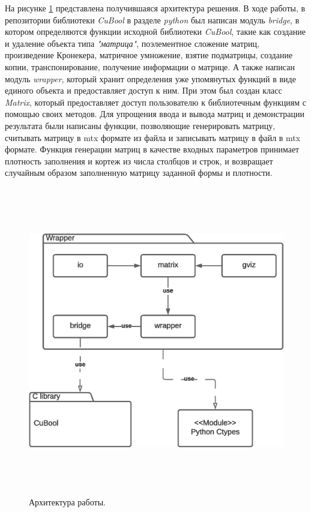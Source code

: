 \documentclass[14pt]{matmex-diploma}
\begin{document}
На рисунке \ref{pic:projectPython} представлена получившаяся архитектура решения. 
В ходе работы, в репозитории библиотеки \textit{CuBool}\cite{cuBool} в разделе \textit{python}
был написан модуль \textit{bridge}, в котором определяются функции исходной библиотеки \textit{CuBool},
такие как создание и удаление объекта типа \textit{"матрица"}, поэлементное сложение матриц, произведение Кронекера,
матричное умножение, взятие подматрицы, создание копии, транспонирование, получение информации о матрице. 
А также написан модуль \textit{wrapper},
который хранит определения уже упомянутых функций в виде единого объекта и предоставляет доступ к ним.
При этом был создан класс \textit{Matrix}, который предоставляет доступ пользователю к библиотечным функциям с помощью своих методов.
Для упрощения ввода и вывода матриц и демонстрации результата были написаны функции,
позволяющие генерировать матрицу, считывать матрицу в mtx формате из файла и записывать матрицу в файл в mtx формате.
Функция генерации матриц в качестве входных параметров принимает плотность заполнения и кортеж из числа столбцов и строк,
и возвращает случайным образом заполненную матрицу заданной формы и плотности. 

\begin{figure}[h!]
    \centering
    \includegraphics[height=13.5cm]{pictures/pycubool.eps}
    \caption{Архитектура работы.}\label{pic:projectPython}
\end{figure}
\newpage
\end{document}
